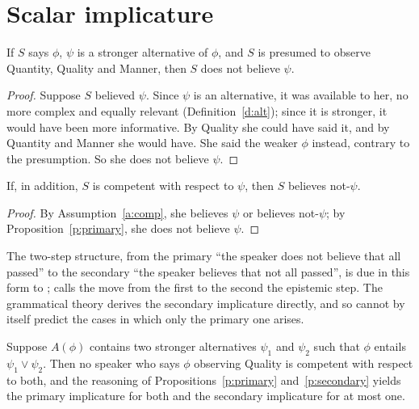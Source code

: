 \documentclass{situationist-preprint}
\begin{document}
\section{Scalar implicature}\label{s:scalar}

\begin{proposition}\label{p:primary}
If $S$ says $\phi$, $\psi$ is a stronger alternative of $\phi$, and $S$ is presumed to observe Quantity, Quality and Manner, then $S$ does not believe $\psi$.
\end{proposition}

\begin{proof}
Suppose $S$ believed $\psi$. Since $\psi$ is an alternative, it was available to her, no more complex and equally relevant (Definition~\ref{d:alt}); since it is stronger, it would have been more informative. By Quality she could have said it, and by Quantity and Manner she would have. She said the weaker $\phi$ instead, contrary to the presumption. So she does not believe $\psi$.
\end{proof}

\begin{proposition}\label{p:secondary}
If, in addition, $S$ is competent with respect to $\psi$, then $S$ believes not-$\psi$.
\end{proposition}

\begin{proof}
By Assumption~\ref{a:comp}, she believes $\psi$ or believes not-$\psi$; by Proposition~\ref{p:primary}, she does not believe $\psi$.
\end{proof}

The two-step structure, from the primary \enquote{the speaker does not believe that all passed} to the secondary \enquote{the speaker believes that not all passed}, is due in this form to \citet{Sauerland2004}; \citet{Geurts2010} calls the move from the first to the second the epistemic step. The grammatical theory derives the secondary implicature directly, and so cannot by itself predict the cases in which only the primary one arises.

\begin{proposition}[Symmetry]\label{p:sym}
Suppose $A(\phi)$ contains two stronger alternatives $\psi_1$ and $\psi_2$ such that $\phi$ entails $\psi_1 \lor \psi_2$. Then no speaker who says $\phi$ observing Quality is competent with respect to both, and the reasoning of Propositions~\ref{p:primary} and~\ref{p:secondary} yields the primary implicature for both and the secondary implicature for at most one.
\end{proposition}
\end{document}
